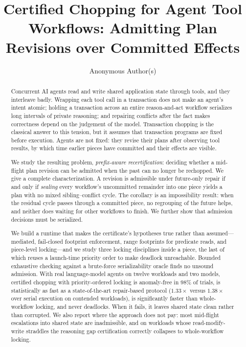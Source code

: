 \documentclass[sigconf,nonacm,anonymous]{acmart}
\begin{document}
\title{Certified Chopping for Agent Tool Workflows: Admitting Plan Revisions over Committed Effects}

\author{Anonymous Author(s)}

\begin{abstract}
Concurrent AI agents read and write shared application state through tools,
and they interleave badly. Wrapping each tool call in a transaction does not
make an agent's intent atomic; holding a transaction across an entire
reason-and-act workflow serializes long intervals of private reasoning; and
repairing conflicts after the fact makes correctness depend on the judgement
of the model. Transaction chopping is the classical answer to this tension,
but it assumes that transaction programs are fixed before execution. Agents
are not fixed: they revise their plans after observing tool results, by which
time earlier pieces have committed and their effects are visible.

We study the resulting problem, \emph{prefix-aware recertification}: deciding
whether a mid-flight plan revision can be admitted when the past can no longer
be rechopped. We give a complete characterization. A revision is admissible
under future-only repair if and only if \emph{sealing} every workflow's
uncommitted remainder into one piece yields a plan with no mixed
sibling--conflict cycle. The corollary is an impossibility result: when the
residual cycle passes through a committed piece, no regrouping of the future
helps, and neither does waiting for other workflows to finish. We further show
that admission decisions must be serialized.

We build a runtime that makes the certificate's hypotheses true rather than
assumed---mediated, fail-closed footprint enforcement, range footprints for
predicate reads, and piece-level locking---and we study three locking
disciplines inside a piece, the last of which reuses a launch-time priority
order to make deadlock unreachable. Bounded exhaustive checking against a
brute-force serializability oracle finds no unsound admission. With real
language-model agents on twelve workloads and two models, certified chopping
with priority-ordered locking is anomaly-free in 98\% of trials, is
statistically as fast as a state-of-the-art repair-based protocol
($1.33\times$ versus $1.38\times$ over serial execution on contended
workloads), is significantly faster than whole-workflow locking, and never
deadlocks. When it fails, it leaves shared state clean rather than corrupted.
We also report where the approach does not pay: most mid-flight escalations into
shared state are inadmissible, and on workloads whose read-modify-write
straddles the reasoning gap certification correctly collapses to
whole-workflow locking.
\end{abstract}
\end{document}
